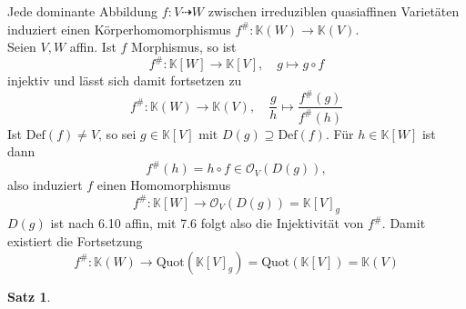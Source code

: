 \documentclass[11pt]{book}
\newtheorem{theorem}{Satz}[section]
\theoremstyle{nonumberbreak}
\newenvironment{pr}[1][]{\ifthenelse{\equal{#1}{}}{\proof}{\proof[#1]}\rm}{\endproof}
\newenvironment{folg}[1][]{\ifthenelse{\equal{#1}{}}{\folger}{\folger[#1]}\rm}{\endfolger}
\begin{document}
\begin{spacing}{1.3}
\begin{folg} %

Jede dominante Abbildung $f: V \dashrightarrow W$ zwischen irreduziblen quasiaffinen Varietäten induziert einen Körperhomomorphismus $f^\#: \mathbb{K}(W) \longrightarrow \mathbb{K}(V)$.\\
\begin{pr}
Seien $V,W$ affin. Ist $f$ Morphismus, so ist 
$$f^\#: \mathbb{K}[W] \longrightarrow \mathbb{K}[V], \quad g \mapsto g \circ f$$
injektiv und lässt sich damit fortsetzen zu 
$$f^\#: \mathbb{K}(W) \longrightarrow \mathbb{K}(V), \quad \frac{g}{h} \mapsto \frac{f^\#(g)}{f^\#(h)}$$
Ist $\textrm{Def}(f) \neq V$, so sei $g \in \mathbb{K}[V]$ mit $D(g) \supseteq \textrm{Def}(f)$. Für $h \in \mathbb{K}[W]$ ist dann
$$f^\#(h) = h \circ f \in \mathcal{O}_V(D(g)),$$
also induziert $f$ einen Homomorphismus
$$f^\#: \mathbb{K}[W] \longrightarrow \mathcal{O}_V(D(g)) = \mathbb{K}[V]_g$$
$D(g)$ ist nach 6.10 affin, mit 7.6 folgt also die Injektivität von $f^\#$. Damit existiert die Fortsetzung
$$f^\#: \mathbb{K}(W) \longrightarrow \textrm{Quot}(\mathbb{K}[V]_g)=\textrm{Quot}(\mathbb{K}[V])=\mathbb{K}(V)$$
\end{pr}
\end{folg}

\begin{theorem} %


\end{theorem}
\end{spacing}
\end{document}
